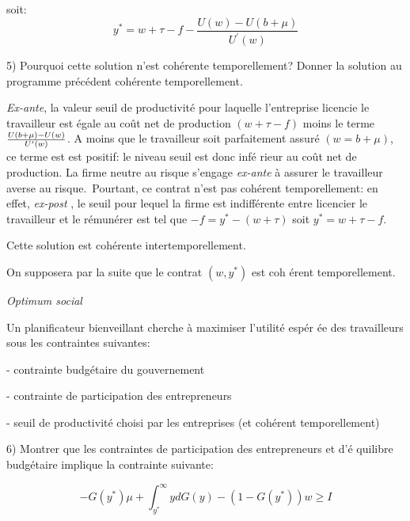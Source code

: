 \documentclass[a4paper]{article}
\begin{document}
soit:%
\begin{equation*}
y^{\ast }=w+\tau -f-\frac{U(w)-U(b+\mu )}{U^{\prime }(w)}
\end{equation*}

5) Pourquoi cette solution n'est coh\'{e}rente temporellement? Donner la
solution au programme pr\'{e}c\'{e}dent coh\'{e}rente temporellement.

\bigskip

\textit{Ex-ante}, la valeur seuil de productivit\'{e} pour laquelle
l'entreprise licencie le travailleur est \'{e}gale au co\^{u}t net de
production $\left( w+\tau -f\right) $ moins le terme $\frac{U(b+\mu )-U(w)}{%
U^{\prime }(w)}$. A moins que le travailleur soit parfaitement assur\'{e} $%
(w=b+\mu )$, ce terme est est positif: le niveau seuil est donc inf\'{e}%
rieur au co\^{u}t net de production. La firme neutre au risque s'engage 
\textit{ex-ante} \`{a} assurer le travailleur averse au risque.\ Pourtant,
ce contrat n'est pas coh\'{e}rent temporellement: en effet, \textit{ex-post}%
, le seuil pour lequel la firme est indiff\'{e}rente entre licencier le
travailleur et le r\'{e}mun\'{e}rer est tel que $-f=y^{\ast }-\left( w+\tau
\right) $ soit $y^{\ast }=w+\tau -f$.

Cette solution est coh\'{e}rente intertemporellement.

\bigskip

On supposera par la suite que le contrat $\left( w,y^{\ast }\right) $ est coh%
\'{e}rent temporellement.

\bigskip

\textit{Optimum social}

\bigskip

Un planificateur bienveillant cherche \`{a} maximiser l'utilit\'{e} esp\'{e}r%
\'{e}e des travailleurs sous les contraintes suivantes:

- contrainte budg\'{e}taire du gouvernement

- contrainte de participation des entrepreneurs

- seuil de productivit\'{e} choisi par les entreprises (et coh\'{e}rent
temporellement)

\bigskip

6) Montrer que les contraintes de participation des entrepreneurs et d'\'{e}%
quilibre budg\'{e}taire implique la contrainte suivante:

\begin{equation*}
-G(y^{\ast })\mu +\int_{y^{\ast }}^{\infty }ydG(y)-\left( 1-G(y^{\ast
})\right) w\geq I
\end{equation*}
\end{document}
